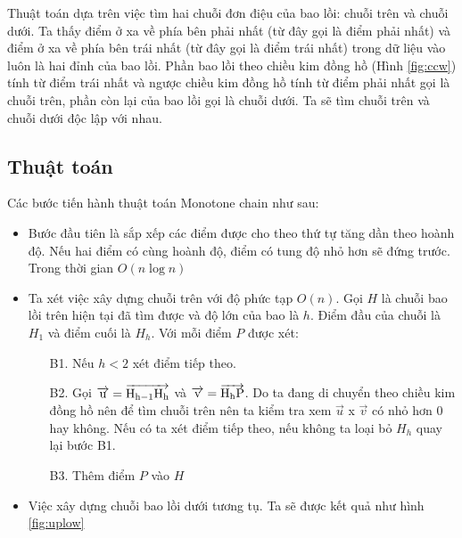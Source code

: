 \documentclass[12pt]{article}
\begin{document}
        Thuật toán dựa trên việc tìm hai chuỗi đơn điệu của bao lồi: chuỗi trên và chuỗi dưới. 
        Ta thấy điểm ở xa về phía bên phải nhất (từ đây gọi là điểm phải nhất) và điểm ở xa về phía bên trái nhất 
        (từ đây gọi là điểm trái nhất) trong dữ liệu vào luôn là hai đỉnh của bao lồi. 
        Phần bao lồi theo chiều kim đồng hồ (Hình \ref{fig:ccw}) tính từ điểm trái nhất và ngược chiều kim đồng hồ tính từ điểm phải nhất gọi là chuỗi trên, 
        phần còn lại của bao lồi gọi là chuỗi dưới.
        Ta sẽ tìm chuỗi trên và chuỗi dưới độc lập với nhau.
      \newpage
      \subsection{Thuật toán}
        Các bước tiến hành thuật toán Monotone chain như sau:
        \begin{itemize}
          \item Bước đầu tiên là sắp xếp các điểm được cho theo thứ tự tăng dần theo hoành độ. Nếu hai điểm có cùng hoành độ, điểm có tung độ nhỏ hơn sẽ đứng trước. Trong thời gian $O(n \log n)$
          \item Ta xét việc xây dựng chuỗi trên với độ phức tạp $O(n)$. 
            Gọi $H$ là chuỗi bao lồi trên hiện tại đã tìm được và độ lớn của bao là $h$. Điểm đầu của chuỗi là $H_1$ và điểm cuối là $H_h$. Với mỗi điểm $P$ được xét:
            \begin{itemize}
              \item[B1.] Nếu $h < 2$ xét điểm tiếp theo.
              \item[B2.] Gọi $\overrightarrow{\rm u} = \overrightarrow{\rm H_{h-1}H_{h}}$ và $\overrightarrow{\rm v} = \overrightarrow{\rm H_hP}$. 
                Do ta đang di chuyển theo chiều kim đồng hồ nên để tìm chuỗi trên nên ta kiểm tra xem $\overrightarrow{u}$ x $\overrightarrow{v}$ có nhỏ hơn 0 hay không.
                Nếu có ta xét điểm tiếp theo, nếu không ta loại bỏ $H_h$ quay lại bước B1.
              \item[B3.] Thêm điểm $P$ vào $H$
            \end{itemize}
          \item Việc xây dựng chuỗi bao lồi dưới tương tụ. Ta sẽ được kết quả như hình \ref{fig:uplow}
        \end{itemize}
      \newpage
\end{document}
